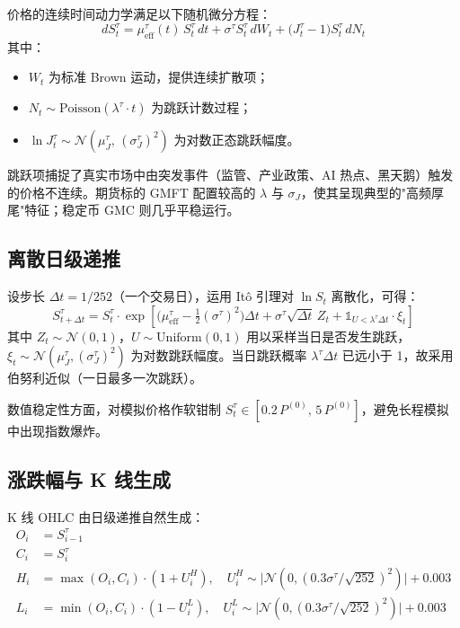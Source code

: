 \documentclass[12pt,a4paper]{article}
\begin{document}
价格的连续时间动力学满足以下随机微分方程：
\begin{equation}
\boxed{\;dS^{\tau}_t = \mu^{\tau}_{\mathrm{eff}}(t)\, S^{\tau}_t\, dt + \sigma^{\tau} S^{\tau}_t\, dW_t + \bigl(J^{\tau}_t - 1\bigr) S^{\tau}_t\, dN_t\;}
\end{equation}
其中：
\begin{itemize}
\item $W_t$ 为标准 Brown 运动，提供连续扩散项；
\item $N_t \sim \mathrm{Poisson}(\lambda^{\tau} \cdot t)$ 为跳跃计数过程；
\item $\ln J^{\tau}_t \sim \mathcal{N}(\mu^{\tau}_J,\, (\sigma^{\tau}_J)^2)$ 为对数正态跳跃幅度。
\end{itemize}

跳跃项捕捉了真实市场中由突发事件（监管、产业政策、AI 热点、黑天鹅）触发的价格不连续。期货标的 GMFT 配置较高的 $\lambda$ 与 $\sigma_J$，使其呈现典型的"高频厚尾"特征；稳定币 GMC 则几乎平稳运行。

\subsection{离散日级递推}

设步长 $\Delta t = 1/252$（一个交易日），运用 Itô 引理对 $\ln S_t$ 离散化，可得：
\begin{equation}
S^{\tau}_{t+\Delta t} = S^{\tau}_t \cdot \exp\!\left[\bigl(\mu^{\tau}_{\mathrm{eff}} - \tfrac{1}{2}(\sigma^{\tau})^2\bigr)\Delta t + \sigma^{\tau}\sqrt{\Delta t}\,Z_t + \mathbb{1}_{U < \lambda^{\tau} \Delta t} \cdot \xi_t\right]
\end{equation}
其中 $Z_t \sim \mathcal{N}(0,1)$，$U \sim \mathrm{Uniform}(0,1)$ 用以采样当日是否发生跳跃，$\xi_t \sim \mathcal{N}(\mu^{\tau}_J, (\sigma^{\tau}_J)^2)$ 为对数跳跃幅度。当日跳跃概率 $\lambda^{\tau}\Delta t$ 已远小于 1，故采用伯努利近似（一日最多一次跳跃）。

数值稳定性方面，对模拟价格作软钳制 $S^{\tau}_t \in [0.2\, P^{(0)},\, 5\, P^{(0)}]$，避免长程模拟中出现指数爆炸。

\subsection{涨跌幅与 K 线生成}

K 线 OHLC 由日级递推自然生成：
\begin{align}
O_i &= S^{\tau}_{i-1} \\
C_i &= S^{\tau}_{i} \\
H_i &= \max(O_i, C_i) \cdot (1 + U^{H}_i),\quad U^{H}_i \sim \bigl|\mathcal{N}(0, (0.3\sigma^{\tau}/\sqrt{252})^2)\bigr| + 0.003 \\
L_i &= \min(O_i, C_i) \cdot (1 - U^{L}_i),\quad U^{L}_i \sim \bigl|\mathcal{N}(0, (0.3\sigma^{\tau}/\sqrt{252})^2)\bigr| + 0.003
\end{align}
\end{document}

